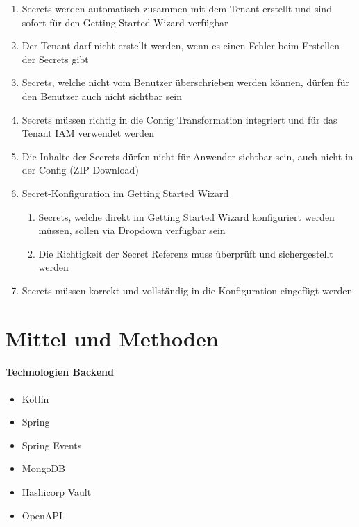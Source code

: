 \begin{enumerate}[label=A\arabic*:, leftmargin=*, itemsep=0.25em]
    \item Secrets werden automatisch zusammen mit dem Tenant erstellt und sind sofort für den Getting Started Wizard verfügbar
    \item Der Tenant darf nicht erstellt werden, wenn es einen Fehler beim Erstellen der Secrets gibt
    \item Secrets, welche nicht vom Benutzer überschrieben werden können, dürfen für den Benutzer auch nicht sichtbar sein
    \item Secrets müssen richtig in die Config Transformation integriert und für das Tenant IAM verwendet werden
    \item Die Inhalte der Secrets dürfen nicht für Anwender sichtbar sein, auch nicht in der Config (ZIP Download)
    \item Secret-Konfiguration im Getting Started Wizard
    \begin{enumerate}[label=A\arabic{enumi}\alph*:, leftmargin=*, itemsep=0.1em]
        \item Secrets, welche direkt im Getting Started Wizard konfiguriert werden müssen, sollen via Dropdown verfügbar sein
        \item Die Richtigkeit der Secret Referenz muss überprüft und sichergestellt werden
    \end{enumerate}
    \item Secrets müssen korrekt und vollständig in die Konfiguration eingefügt werden
\end{enumerate}

\section{Mittel und Methoden}\label{sec:mittel-und-methoden}

\paragraph{Technologien Backend}
\begin{itemize}
    \item Kotlin
    \item Spring
    \item Spring Events
    \item MongoDB
    \item Hashicorp Vault
    \item OpenAPI
\end{itemize}


